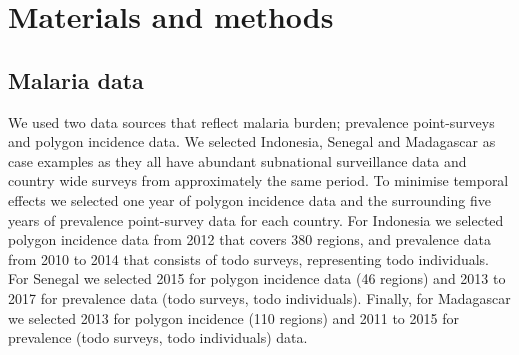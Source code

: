 \documentclass[10pt,letterpaper]{article}
\begin{document}




\section*{Materials and methods}


\subsection*{Malaria data}

We used two data sources that reflect malaria burden; prevalence point-surveys and polygon incidence data.
We selected Indonesia, Senegal and Madagascar as case examples as they all have abundant subnational surveillance data and country wide surveys from approximately the same period.
To minimise temporal effects we selected one year of polygon incidence data and the surrounding five years of prevalence point-survey data for each country.
For Indonesia we selected polygon incidence data from 2012 that covers 380 regions, and prevalence data from 2010 to 2014 that consists of todo surveys, representing todo individuals.
For Senegal we selected 2015 for polygon incidence data (46 regions) and 2013 to 2017 for prevalence data (todo surveys, todo individuals).
Finally, for Madagascar we selected 2013 for polygon incidence (110 regions) and 2011 to 2015 for prevalence (todo surveys, todo individuals) data.
\end{document}

